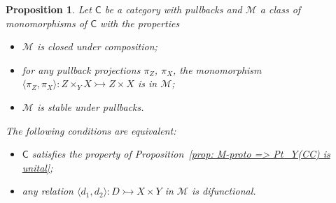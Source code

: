 \documentclass[10pt,a4paper]{amsart}
\theoremstyle{plain}
\newtheorem{proposition}[subsection]{Proposition}
\theoremstyle{definition}
\theoremstyle{remark}
\newcommand{\C}{\ensuremath{\mathsf{C}}}
\newcommand{\M}{\ensuremath{\mathscr{M}}}
\newcommand{\la}{\langle}
\newcommand{\ra}{\rangle}
\newcommand{\mono}{\rightarrowtail}
\begin{document}
\begin{proposition}\label{prop: Pt_Y(CC) unital <=> M-Mal'tsev} Let $\C$ be a category with pullbacks and $\M$ a class of monomorphisms of $\C$ with the properties
\begin{itemize}
	\item[(P2)] $\M$ is closed under composition;
	\item[(P4)] for any pullback projections $\pi_Z$, $\pi_X$, the monomorphism $\la \pi_Z,\pi_X\ra\colon Z\times_Y X\mono Z\times X$ is in $\M$;
	\item[(P5)] $\M$ is stable under pullbacks.
\end{itemize}
The following conditions are equivalent:
\begin{itemize}
	\item[(i)] $\C$ satisfies the property of Proposition~\ref{prop: M-proto => Pt_Y(CC) is unital};
	\item[(ii)] any relation $\la d_1,d_2\ra\colon  D \mono X\times Y$ in $\M$ is difunctional.
\end{itemize}
\end{proposition}
\end{document}

